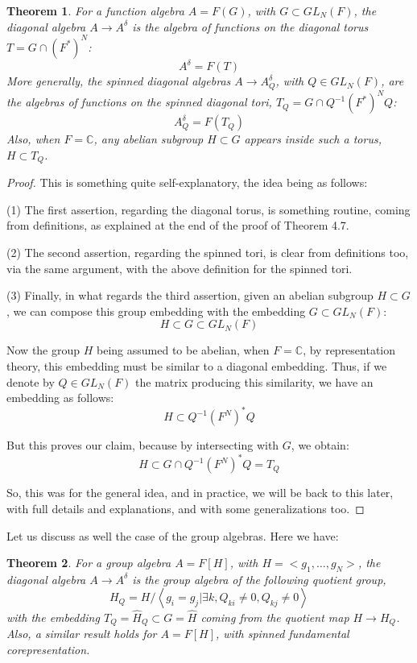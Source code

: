 \documentclass[12pt]{amsbook}
\newtheorem{theorem}{Theorem}[chapter]
\begin{document}
\begin{theorem}
For a function algebra $A=F(G)$, with $G\subset GL_N(F)$, the diagonal algebra $A\to A^\delta$ is the algebra of functions on the diagonal torus $T=G\cap(F^*)^N$:
$$A^\delta=F(T)$$
More generally, the spinned diagonal algebras $A\to A^\delta_Q$,  with $Q\in GL_N(F)$, are the algebras of functions on the spinned diagonal tori, $T_Q=G\cap Q^{-1}(F^*)^NQ$:
$$A^\delta_Q=F(T_Q)$$
Also, when $F=\mathbb C$, any abelian subgroup $H\subset G$ appears inside such a torus, $H\subset T_Q$.
\end{theorem}

\begin{proof}
This is something quite self-explanatory, the idea being as follows:

\medskip

(1) The first assertion, regarding the diagonal torus, is something routine, coming from definitions, as explained at the end of the proof of Theorem 4.7.

\medskip

(2) The second assertion, regarding the spinned tori, is clear from definitions too, via the same argument, with the above definition for the spinned tori.

\medskip

(3) Finally, in what regards the third assertion, given an abelian subgroup $H\subset G$, we can compose this group embedding with the embedding $G\subset GL_N(F)$:
$$H\subset G\subset GL_N(F)$$

Now the group $H$ being assumed to be abelian, when $F=\mathbb C$, by representation theory, this embedding must be similar to a diagonal embedding. Thus, if we denote by $Q\in GL_N(F)$ the matrix producing this similarity, we have an embedding as follows:
$$H\subset Q^{-1}(F^N)^*Q$$

But this proves our claim, because by intersecting with $G$, we obtain:
$$H\subset G\cap Q^{-1}(F^N)^*Q=T_Q$$

So, this was for the general idea, and in practice, we will be back to this later, with full details and explanations, and with some generalizations too.
\end{proof}

Let us discuss as well the case of the group algebras. Here we have:

\begin{theorem}
For a group algebra $A=F[H]$, with $H=<g_1,\ldots,g_N>$, the diagonal algebra $A\to A^\delta$ is the group algebra of the following quotient group,
$$H_Q=H\Big/\left<g_i=g_j\Big|\exists k,Q_{ki}\neq0,Q_{kj}\neq0\right>$$
with the embedding $T_Q=\widehat{H}_Q\subset G=\widehat{H}$ coming from the quotient map $H\to H_Q$. Also, a similar result holds for $A=F[H]$, with spinned fundamental corepresentation.
\end{theorem}
\end{document}
